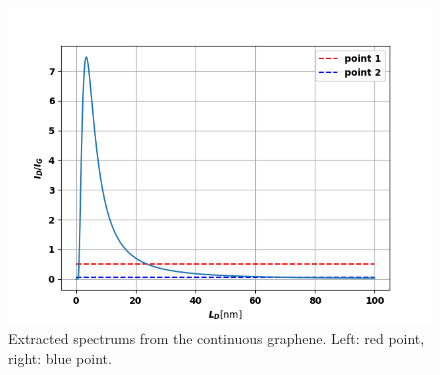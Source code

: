 \documentclass[12pt,a4paper]{article}
\begin{document}
\begin{figure}
\centering
\includegraphics[scale=0.7]{Bilder/part7/fit.png}
\caption{Extracted spectrums from the continuous graphene. Left: red point, right: blue point.}
\label{fig:part7_fit}
\end{figure}
\end{document}
